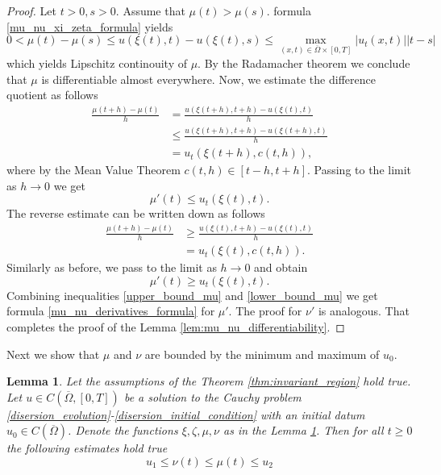 \documentclass[12pt, a4paper]{article}
\theoremstyle{break}
\theoremstyle{break}
\theoremstyle{break}
\theoremstyle{break}
\newtheorem{lem}{Lemma}[section]
\theoremstyle{break}
\begin{document}
\begin{proof}
    Let $t > 0, s > 0$. Assume that $\mu(t) > \mu(s)$. formula \eqref{mu_nu_xi_zeta_formula} yields
    \begin{equation*}
        0 < \mu(t) - \mu(s) \leq u(\xi(t), t) - u(\xi(t), s) \leq \max_{(x,t) \in \overline{\Omega} \times [0, T]}|u_t(x,t)||t-s|
    \end{equation*}
    which yields Lipschitz continouity of $\mu$. By the Radamacher theorem \cite{Evans} we conclude that $\mu$ is differentiable almost everywhere. Now, we estimate the difference quotient as follows
    \begin{align*}
        \frac{\mu(t+h) - \mu(t)}{h} 
        &= \frac{u(\xi(t+h),t+h) - u(\xi(t), t)}{h} \\
        &\leq \frac{u(\xi(t+h),t+h) - u(\xi(t+h), t)}{h} \\
        &= u_t(\xi(t+h), c(t, h)),
    \end{align*}
    where by the Mean Value Theorem $c(t, h) \in [t-h, t+h]$. Passing to the limit as $h \rightarrow 0$ we get
    \begin{equation}
        \mu'(t) \leq u_t(\xi(t), t).
        \label{upper_bound_mu}
    \end{equation}
    The reverse estimate can be written down as follows
    \begin{align*}
        \frac{\mu(t+h) - \mu(t)}{h}
        &\geq \frac{u(\xi(t),t+h) - u(\xi(t), t)}{h} \\
        &= u_t(\xi(t), c(t, h)).
    \end{align*}
    Similarly as before, we pass to the limit as $h \rightarrow 0$ and obtain
    \begin{equation}
        \mu'(t) \geq u_t(\xi(t), t).
        \label{lower_bound_mu}
    \end{equation}
    Combining inequalities \eqref{upper_bound_mu} and \eqref{lower_bound_mu} we get formula \eqref{mu_nu_derivatives_formula} for $\mu'$. The proof for $\nu'$ is analogous. That completes the proof of the Lemma \ref{lem:mu_nu_differentiability}.
\end{proof}

Next we show that $\mu$ and $\nu$ are bounded by the minimum and maximum of $u_0$.

\begin{lem}
    Let the assumptions of the Theorem \ref{thm:invariant_region} hold true. Let $u \in C\left(\overline{\Omega}, [0, T]\right)$ be a solution to the Cauchy problem \eqref{disersion_evolution}-\eqref{disersion_initial_condition} with an initial datum $u_0 \in C(\overline{\Omega})$. Denote the functions $\xi, \zeta, \mu, \nu$ as in the Lemma \ref{lem:invariant_region_cont}. Then for all $t \geq 0$ the following estimates hold true
    \begin{equation*}
        u_1 \leq \nu(t) \leq \mu(t) \leq u_2
    \end{equation*}
    \label{lem:invariant_region_cont}
\end{lem}
\end{document}
